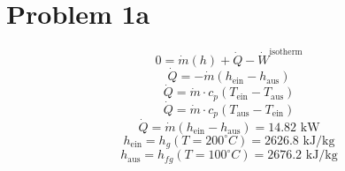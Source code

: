 \section*{Problem 1a}
\[
0 = \dot{m}(h) + \dot{Q} - \dot{W}^{\text{isotherm}}
\]
\[
\dot{Q} = -\dot{m}(h_{\text{ein}} - h_{\text{aus}})
\]
\[
\dot{Q} = \dot{m} \cdot c_p (T_{\text{ein}} - T_{\text{aus}})
\]
\[
\dot{Q} = \dot{m} \cdot c_p (T_{\text{aus}} - T_{\text{ein}})
\]
\[
\dot{Q} = \dot{m}(h_{\text{ein}} - h_{\text{aus}}) = \boxed{14.82 \text{ kW}}
\]
\[
h_{\text{ein}} = h_g(T = 200^\circ C) = 2626.8 \text{ kJ/kg}
\]
\[
h_{\text{aus}} = h_{fg}(T = 100^\circ C) = 2676.2 \text{ kJ/kg}
\]